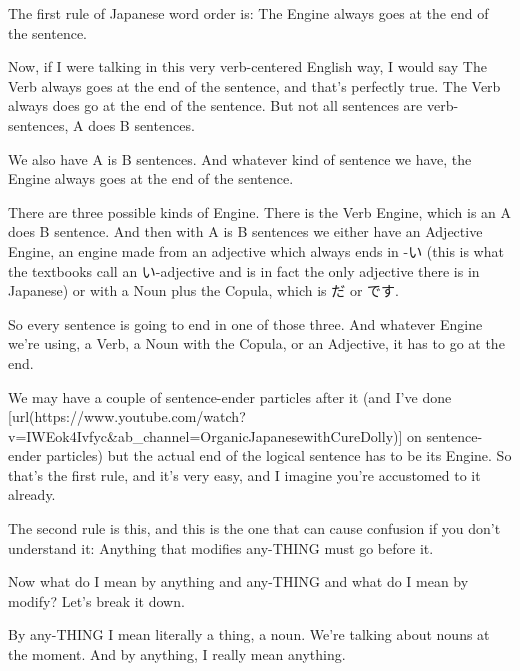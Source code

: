\startsectionlevel[title={Rule 1},reference={rule-1}]

The first rule of Japanese word order is: The Engine always goes at the end of the sentence.

{}

Now, if I were talking in this very verb-centered English way, I would say The Verb always goes at the end of the sentence, and that's perfectly true. The Verb always does go at the end of the sentence. But not all sentences are verb-sentences, A does B sentences.

We also have A is B sentences. And whatever kind of sentence we have, the Engine always goes at the end of the sentence.

{}

There are three possible kinds of Engine. There is the Verb Engine, which is an A does B sentence. And then with A is B sentences we either have an Adjective Engine, an engine made from an adjective which always ends in -い (this is what the textbooks call an い-adjective and is in fact the only adjective there is in Japanese) or with a Noun plus the Copula, which is だ or です.

So every sentence is going to end in one of those three. And whatever Engine we're using, a Verb, a Noun with the Copula, or an Adjective, it has to go at the end.

We may have a couple of sentence-ender particles after it (and I've done [url(https://www.youtube.com/watch?v=IWEok4Ivfyc&ab_channel=OrganicJapanesewithCureDolly)] on sentence-ender particles) but the actual end of the logical sentence has to be its Engine. So that's the first rule, and it's very easy, and I imagine you're accustomed to it already.

\stopsectionlevel

\startsectionlevel[title={Rule 2},reference={rule-2}]

The second rule is this, and this is the one that can cause confusion if you don't understand it: Anything that modifies any-THING must go before it.

{}

Now what do I mean by anything and any-THING and what do I mean by modify? Let's break it down.

By any-THING I mean literally a thing, a noun. We're talking about nouns at the moment. And by anything, I really mean anything.

